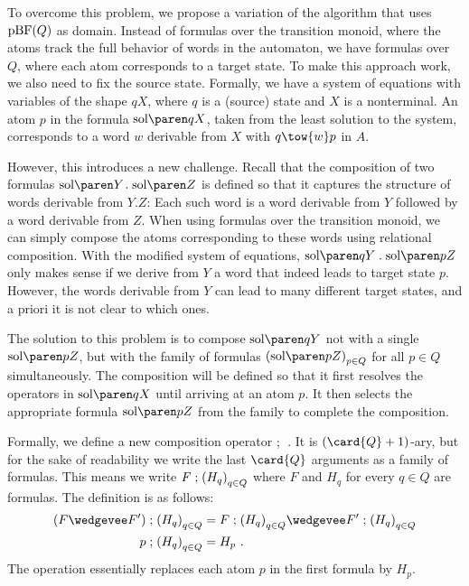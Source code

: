 \documentclass[../../diss.tex]{subfiles}
\begin{document}
To overcome this problem, we propose a variation of the algorithm that uses $\text{pBF}(Q)$ as domain.
Instead of formulas over the transition monoid, where the atoms track the full behavior of words in the automaton, we have formulas over $Q$, where each atom corresponds to a target state.
To make this approach work, we also need to fix the source state.
Formally, we have a system of equations with variables of the shape $qX$, where $q$ is a (source) state and $X$ is a nonterminal.
An atom $p$ in the formula $\sol{qX}$, taken from the least solution to the system, corresponds to a word $w$ derivable from $X$ with $q \tow{w} p$ in $A$.

However, this introduces a new challenge.
Recall that the composition of two formulas $\sol{Y} \comp \sol{Z}$ is defined so that it captures the structure of words derivable from $Y.Z$:
Each such word is a word derivable from $Y$ followed by a word derivable from $Z$.
When using formulas over the transition monoid, we can simply compose the atoms corresponding to these words using relational composition.
With the modified system of equations, $\sol{qY} \comp \sol{pZ}$ only makes sense if we derive from $Y$ a word that indeed leads to target state $p$.
However, the words derivable from $Y$ can lead to many different target states, and a priori it is not clear to which ones.

The solution to this problem is to compose $\sol{qY}$ not with a single $\sol{pZ}$, but with the family of formulas ${(\sol{pZ})}_{p \in Q}$ for all $p \in Q$ simultaneously.
The composition will be defined so that it first resolves the operators in $\sol{qX}$ until arriving at an atom $p$.
It then selects the appropriate formula $\sol{pZ}$ from the family to complete the composition.

Formally, we define a new composition operator $\mathrel{;}$\ .
It is $(\card{Q} + 1)$-ary, but for the sake of readability we write the last $\card{Q}$ arguments as a family of formulas.
This means we write $F \mathrel{;} {(H_q)}_{q \in Q}$ where $F$ and $H_q$ for every $q \in Q$ are formulas.
The definition is as follows:
%
\begin{align*}
    (F \wedgevee F') \supercomp {(H_q)}_{q \in Q} &= F \supercomp {(H_q)}_{q \in Q} \wedgevee F' \supercomp {(H_q)}_{q \in Q}
    \\
    p \supercomp {(H_q)}_{q \in Q} &= H_p
    \ .
\end{align*}
%
The operation essentially replaces each atom $p$ in the first formula by $H_p$.
\end{document}
